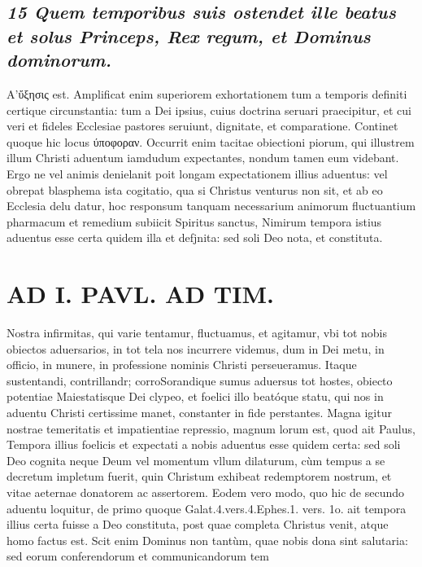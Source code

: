 \documentclass{article}
\begin{document}
\begin{pages}
\subsection*{\textit{15 Quem temporibus suis ostendet ille beatus et solus Princeps, Rex regum, et Dominus dominorum. }}\pstart Α'ὔξησις est. Amplificat enim superiorem exhortationem tum a temporis definiti certique circunstantia: tum a Dei ipsius, cuius doctrina seruari praecipitur, et cui veri et fideles Ecclesiae pastores seruiunt, dignitate, et comparatione. Continet quoque hic locus ύποφοραν. Occurrit enim tacitae obiectioni piorum, qui illustrem illum Christi aduentum iamdudum expectantes, nondum tamen eum videbant. Ergo ne vel animis denielanit poit longam expectationem illius aduentus: vel obrepat blasphema ista cogitatio, qua si Christus venturus non sit, et ab eo Ecclesia delu datur, hoc responsum tanquam necessarium animorum fluctuantium pharmacum et remedium subiicit Spiritus sanctus, Nimirum tempora istius aduentus esse certa quidem illa et defjnita: sed soli Deo nota, et constituta.  \pend
\section*{AD I. PAVL. AD TIM. }
\marginpar{[ p.110 ]} Nostra infirmitas, qui varie tentamur, fluctuamus, et agitamur, vbi tot nobis obiectos aduersarios, in tot tela nos incurrere videmus, dum in Dei metu, in officio, in munere, in professione nominis Christi perseueramus. Itaque sustentandi, contrillandr; corroSorandique sumus aduersus tot hostes, obiecto potentiae Maiestatisque Dei clypeo, et foelici illo beatóque statu, qui nos in aduentu Christi certissime manet, constanter in fide perstantes.  \pend\pstart Magna igitur nostrae temeritatis et impatientiae repressio, magnum lorum est, quod ait Paulus, Tempora illius foelicis et expectati a nobis aduentus esse quidem certa: sed soli Deo cognita neque Deum vel momentum vllum dilaturum, cùm tempus a se decretum impletum fuerit, quin Christum exhibeat redemptorem nostrum, et vitae aeternae donatorem ac assertorem. Eodem vero modo, quo hic de secundo aduentu loquitur, de primo quoque Galat.4.vers.4.Ephes.1. vers. 1o. ait tempora illius certa fuisse a Deo constituta, post quae completa Christus venit, atque homo factus est. Scit enim Dominus non tantùm, quae nobis dona sint salutaria: sed eorum conferendorum et communicandorum tem\pend

\end{pages}
\end{document}
